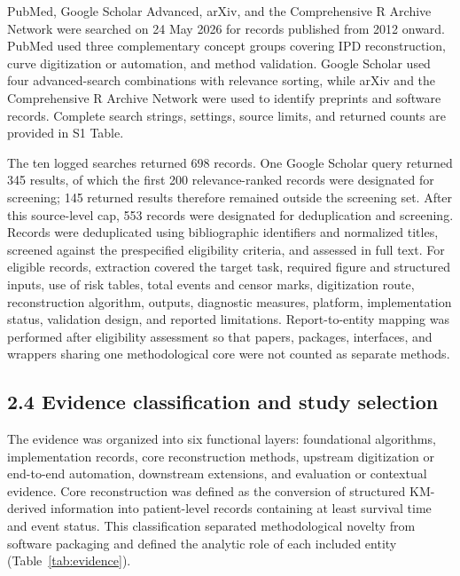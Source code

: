 \documentclass[12pt,letterpaper]{article}
\begin{document}
PubMed, Google Scholar Advanced, arXiv, and the Comprehensive R Archive Network were searched on 24 May 2026 for records published from 2012 onward. PubMed used three complementary concept groups covering IPD reconstruction, curve digitization or automation, and method validation. Google Scholar used four advanced-search combinations with relevance sorting, while arXiv and the Comprehensive R Archive Network were used to identify preprints and software records. Complete search strings, settings, source limits, and returned counts are provided in S1 Table.

The ten logged searches returned 698 records. One Google Scholar query returned 345 results, of which the first 200 relevance-ranked records were designated for screening; 145 returned results therefore remained outside the screening set. After this source-level cap, 553 records were designated for deduplication and screening. Records were deduplicated using bibliographic identifiers and normalized titles, screened against the prespecified eligibility criteria, and assessed in full text. For eligible records, extraction covered the target task, required figure and structured inputs, use of risk tables, total events and censor marks, digitization route, reconstruction algorithm, outputs, diagnostic measures, platform, implementation status, validation design, and reported limitations. Report-to-entity mapping was performed after eligibility assessment so that papers, packages, interfaces, and wrappers sharing one methodological core were not counted as separate methods.

\subsection*{2.4 Evidence classification and study selection}

The evidence was organized into six functional layers: foundational algorithms, implementation records, core reconstruction methods, upstream digitization or end-to-end automation, downstream extensions, and evaluation or contextual evidence. Core reconstruction was defined as the conversion of structured KM-derived information into patient-level records containing at least survival time and event status. This classification separated methodological novelty from software packaging and defined the analytic role of each included entity (Table~\ref{tab:evidence}).
\end{document}
